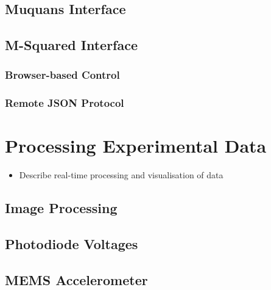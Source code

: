 \subsection{Muquans Interface}\label{subsec:compinterface_muquans}
\subsection{M-Squared Interface}\label{subsec:compinterface_msquared}
\subsubsection{Browser-based Control}
\subsubsection{Remote JSON Protocol}

\section{Processing Experimental Data}\label{sec:compinterface_dataprocessing}
\begin{itemize}
   \item Describe real-time processing and visualisation of data 
\end{itemize}
\subsection{Image Processing}\label{subsec:compinterface_imageprocess}
\subsection{Photodiode Voltages}\label{subsec:compinterface_photodidode}
\subsection{MEMS Accelerometer}\label{subsec:compinterface_mems}